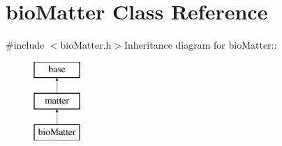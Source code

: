 \hypertarget{classbio_matter}{
\section{bioMatter Class Reference}
\label{classbio_matter}
}


{\ttfamily \#include $<$bioMatter.h$>$}Inheritance diagram for bioMatter::\begin{figure}[H]
\begin{center}
\leavevmode
\includegraphics[height=3cm]{classbio_matter}
\end{center}
\end{figure}
